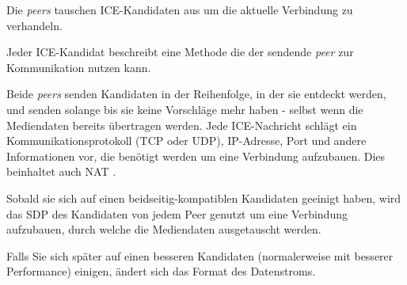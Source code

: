 Die \textit{peers} tauschen ICE-Kandidaten aus um die aktuelle Verbindung zu verhandeln.

Jeder ICE-Kandidat beschreibt eine Methode die der sendende \textit{peer} zur Kommunikation nutzen kann.

Beide \textit{peers} senden Kandidaten in der Reihenfolge, in der sie entdeckt werden, und senden solange bis sie keine Vorschläge
mehr haben - selbst wenn die Mediendaten bereits übertragen werden.
Jede ICE-Nachricht schlägt ein Kommunikationsprotokoll (TCP oder UDP), IP-Adresse, Port und andere Informationen vor, die benötigt werden
um eine Verbindung aufzubauen.
Dies beinhaltet auch NAT .

Sobald sie sich auf einen beidseitig-kompatiblen Kandidaten geeinigt haben, wird das SDP des Kandidaten von jedem Peer genutzt um eine
Verbindung aufzubauen, durch welche die Mediendaten ausgetauscht werden.

Falls Sie sich später auf einen besseren Kandidaten (normalerweise mit besserer Performance) einigen, ändert sich das Format des Datenstroms.

\parencite{MDNSignaling}

